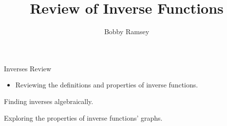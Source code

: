 \documentclass{ximera}
\author{Bobby Ramsey}
\title{Review of Inverse Functions}
\begin{document}
\begin{abstract}
\end{abstract}
\maketitle


\begin{objectives}
	\item Inverses Review
		\begin{itemize}
			\item Reviewing the definitions and properties of inverse functions.
		\end{itemize}
	
	\item Finding inverses algebraically. 
	\item Exploring the properties of inverse functions' graphs. 

\end{objectives}
\end{document}

